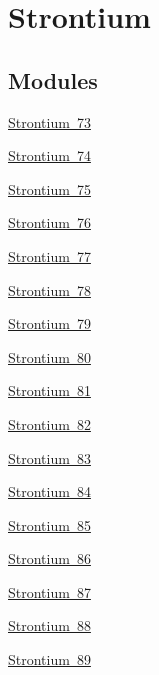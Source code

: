 \hypertarget{group___isotope_const-_strontium}{}\section{Strontium}
\label{group___isotope_const-_strontium}
\subsection*{Modules}
\begin{DoxyCompactItemize}
\item 
\mbox{\hyperlink{group___isotope_const-_strontium-_sr73}{Strontium 73}}
\item 
\mbox{\hyperlink{group___isotope_const-_strontium-_sr74}{Strontium 74}}
\item 
\mbox{\hyperlink{group___isotope_const-_strontium-_sr75}{Strontium 75}}
\item 
\mbox{\hyperlink{group___isotope_const-_strontium-_sr76}{Strontium 76}}
\item 
\mbox{\hyperlink{group___isotope_const-_strontium-_sr77}{Strontium 77}}
\item 
\mbox{\hyperlink{group___isotope_const-_strontium-_sr78}{Strontium 78}}
\item 
\mbox{\hyperlink{group___isotope_const-_strontium-_sr79}{Strontium 79}}
\item 
\mbox{\hyperlink{group___isotope_const-_strontium-_sr80}{Strontium 80}}
\item 
\mbox{\hyperlink{group___isotope_const-_strontium-_sr81}{Strontium 81}}
\item 
\mbox{\hyperlink{group___isotope_const-_strontium-_sr82}{Strontium 82}}
\item 
\mbox{\hyperlink{group___isotope_const-_strontium-_sr83}{Strontium 83}}
\item 
\mbox{\hyperlink{group___isotope_const-_strontium-_sr84}{Strontium 84}}
\item 
\mbox{\hyperlink{group___isotope_const-_strontium-_sr85}{Strontium 85}}
\item 
\mbox{\hyperlink{group___isotope_const-_strontium-_sr86}{Strontium 86}}
\item 
\mbox{\hyperlink{group___isotope_const-_strontium-_sr87}{Strontium 87}}
\item 
\mbox{\hyperlink{group___isotope_const-_strontium-_sr88}{Strontium 88}}
\item 
\mbox{\hyperlink{group___isotope_const-_strontium-_sr89}{Strontium 89}}
\item 

\end{DoxyCompactItemize}
